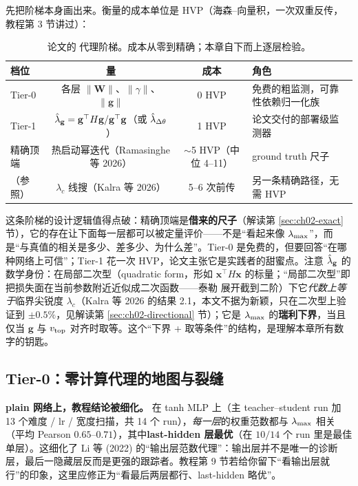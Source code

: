 先把阶梯本身画出来。衡量的成本单位是 HVP（海森--向量积，一次双重反传，教程第 3
节讲过）：

\begin{table}[!ht]
\centering\small
\caption{论文的 \lmax 代理阶梯。成本从零到精确；本章自下而上逐层检验。}
\label{tab:ch04-ladder}
\begin{tabular}{lccl}
\toprule
档位 & 量 & 成本 & 角色 \\
\midrule
Tier-0 & 各层 $\|\mathbf{W}\|$、$\|\gamma\|$、$\|\mathbf{g}\|$ & 0 HVP & 免费的粗监测，可靠性依赖归一化族 \\
Tier-1 & $\hat{\lambda}_{\mathbf{g}}=\mathbf{g}^{\top}H\mathbf{g}/\mathbf{g}^{\top}\mathbf{g}$（或 $\hat{\lambda}_{\Delta\theta}$） & 1 HVP & 论文交付的部署级监测器 \\
精确顶端 & 热启动幂迭代（Ramasinghe 等 2026） & $\sim$5 HVP（中位 4--11） & ground truth 尺子 \\
（参照） & $\lambda_c$ 线搜（Kalra 等 2026） & 5--6 次前传 & 另一条精确路径，无需 HVP \\
\bottomrule
\end{tabular}
\end{table}

这条阶梯的设计逻辑值得点破：精确顶端是\textbf{借来的尺子}（解读第
\ref{sec:ch02-exact} 节），它的存在让下面每一层都可以被定量评价——不是“看起来像
$\lambda_{\max}$”，而是“与真值的相关是多少、差多少、为什么差”。Tier-0
是免费的，但要回答“在哪种网络上可信”；Tier-1 花一次
HVP，论文主张它是实践者的甜蜜点。注意 $\hat{\lambda}_{\mathbf{g}}$
的数学身份：在局部二次型（quadratic form，形如 $\mathbf{x}^{\!\top}\!H\mathbf{x}$
的标量；“局部二次型”即把损失面在当前参数附近近似成二次函数——泰勒
展开截到二阶）下它\emph{代数上等于}临界尖锐度 $\lambda_c$（Kalra 等
2026 的结果 2.1，本文不据为新颖，只在二次型上验证到 $\pm0.5\%$，见解读第
\ref{sec:ch02-directional} 节）；它是 $\lambda_{\max}$ 的\textbf{瑞利下界}，当且仅当
$\mathbf{g}$ 与 $v_{\mathrm{top}}$ 对齐时取等。这个“下界 +
取等条件”的结构，是理解本章所有数字的钥匙。

\subsection{Tier-0：零计算代理的地图与裂缝}
\label{sec:ch04-tier0}

\textbf{plain 网络上，教程结论被细化。} 在 tanh MLP 上（主 teacher--student run
加 13 个难度 / lr / 宽度扫描，共 14 个 run），\emph{每一层}的权重范数都与
$\lambda_{\max}$ 相关（平均 Pearson $0.65$--$0.71$），其中\textbf{last-hidden 层最优}（在
$10/14$ 个 run 里是最佳单层）。这细化了 Li 等 (2022)
的“输出层范数代理”：输出层并不是唯一的诊断层，最后一隐藏层反而是更强的跟踪者。教程第
9 节若给你留下“看输出层就行”的印象，这里应修正为“看最后两层都行、last-hidden
略优”。


